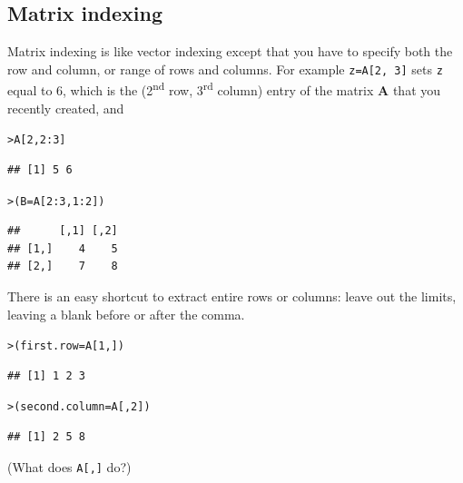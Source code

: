 \documentclass[11pt]{article}\usepackage[]{graphicx}\usepackage[]{color}
\makeatletter
\newcommand{\hlnum}[1]{\textcolor[rgb]{0.686,0.059,0.569}{#1}}%
\newcommand{\hlopt}[1]{\textcolor[rgb]{0,0,0}{#1}}%
\newcommand{\hlstd}[1]{\textcolor[rgb]{0.345,0.345,0.345}{#1}}%
\newcommand{\hlkwb}[1]{\textcolor[rgb]{0.69,0.353,0.396}{#1}}%
\newenvironment{kframe}{%
 \def\at@end@of@kframe{}%
 \ifinner\ifhmode%
  \def\at@end@of@kframe{\end{minipage}}%
  \begin{minipage}{\columnwidth}%
 \fi\fi%
 \def\FrameCommand##1{\hskip\@totalleftmargin \hskip-\fboxsep
 \colorbox{shadecolor}{##1}\hskip-\fboxsep
     \hskip-\linewidth \hskip-\@totalleftmargin \hskip\columnwidth}%
 \MakeFramed {\advance\hsize-\width
   \@totalleftmargin\z@ \linewidth\hsize
   \@setminipage}}%
 {\par\unskip\endMakeFramed%
 \at@end@of@kframe}
\newenvironment{knitrout}{}{} %
\newcommand{\code}[1]{{\tt #1}}
\numberwithin{exercise}{section}
\makeatother
\begin{document}
\subsection{Matrix indexing}
Matrix indexing is like vector indexing except that you have to
specify both the row and column, or range of rows and columns. For
example \code{z=A[2, 3]} sets \code{z} equal to 6, which is the
(2\textsuperscript{nd} row, 3\textsuperscript{rd} column) entry of the
matrix \textbf{A} that you recently created, and
\begin{knitrout}
\color{fgcolor}\begin{kframe}
\begin{alltt}
\hlstd{> }\hlstd{A[}\hlnum{2}\hlstd{,} \hlnum{2}\hlopt{:}\hlnum{3}\hlstd{]}
\end{alltt}
\begin{verbatim}
## [1] 5 6
\end{verbatim}
\begin{alltt}
\hlstd{> }\hlstd{(B} \hlkwb{=} \hlstd{A[}\hlnum{2}\hlopt{:}\hlnum{3}\hlstd{,} \hlnum{1}\hlopt{:}\hlnum{2}\hlstd{])}
\end{alltt}
\begin{verbatim}
##      [,1] [,2]
## [1,]    4    5
## [2,]    7    8
\end{verbatim}
\end{kframe}
\end{knitrout}

There is an easy shortcut to extract entire rows or columns: leave out the limits,
leaving a blank before or after the comma.
\begin{knitrout}
\color{fgcolor}\begin{kframe}
\begin{alltt}
\hlstd{> }\hlstd{(first.row}\hlkwb{=}\hlstd{A[}\hlnum{1}\hlstd{,])}
\end{alltt}
\begin{verbatim}
## [1] 1 2 3
\end{verbatim}
\begin{alltt}
\hlstd{> }\hlstd{(second.column}\hlkwb{=}\hlstd{A[,}\hlnum{2}\hlstd{])}
\end{alltt}
\begin{verbatim}
## [1] 2 5 8
\end{verbatim}
\end{kframe}
\end{knitrout}

(What does \code{A[,]} do?)
\end{document}
